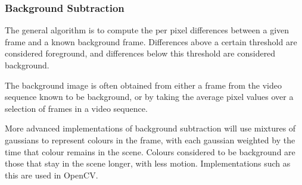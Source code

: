 \subsubsection{Background Subtraction}

The general algorithm is to compute the per pixel differences between a given frame and a known background frame. Differences above a certain threshold are considered foreground, and differences below this threshold are considered background.

The background image is often obtained from either a frame from the video sequence known to be background, or by taking the average pixel values over a selection of frames in a video sequence.

More advanced implementations of background subtraction will use mixtures of gaussians to represent colours in the frame, with each gaussian weighted by the time that colour remains in the scene\cite{backgroundsubmog}. Colours considered to be background are those that stay in the scene longer, with less motion. Implementations such as this are used in OpenCV\cite{opencv}.